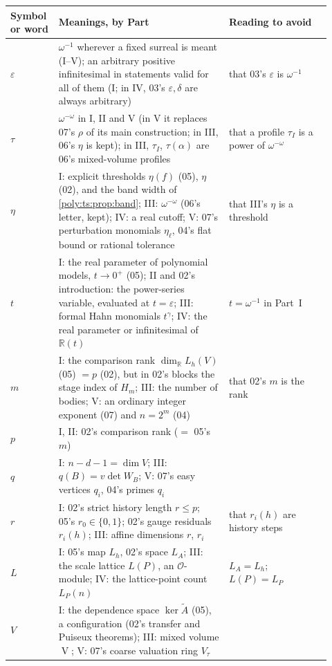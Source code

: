 \documentclass[11pt,a4paper]{article}
\numberwithin{equation}{section}
\theoremstyle{plain}
\newcommand{\R}{\mathbb R}
\newcommand{\eps}{\varepsilon}
\newcommand{\Atil}{\widetilde A}
\newcommand{\OO}{\mathcal O}
\newcommand{\MV}{\operatorname{V}}
\begin{document}
{\small
\begin{longtable}{@{}>{\raggedright\arraybackslash}p{0.12\linewidth}>{\raggedright\arraybackslash}p{0.5\linewidth}>{\raggedright\arraybackslash}p{0.3\linewidth}@{}}
\toprule
Symbol or word & Meanings, by Part & Reading to avoid\\
\midrule
\endhead
\bottomrule
\endfoot
$\eps$ & $\omega^{-1}$ wherever a fixed surreal is meant (I--V); an arbitrary positive infinitesimal in statements valid for all of them (I; in IV, 03's $\eps,\delta$ are always arbitrary) & that 03's $\eps$ is $\omega^{-1}$\\
$\tau$ & $\omega^{-\omega}$ in I, II and V (in V it replaces 07's $\rho$ of its main construction; in III, 06's $\eta$ is kept); in III, $\tau_I$, $\tau(\alpha)$ are 06's mixed-volume profiles & that a profile $\tau_I$ is a power of $\omega^{-\omega}$\\
$\eta$ & I: explicit thresholds $\eta(f)$ (05), $\eta$ (02), and the band width of \cref{poly:ts:prop:band}; III: $\omega^{-\omega}$ (06's letter, kept); IV: a real cutoff; V: 07's perturbation monomials $\eta_\ell$, 04's flat bound or rational tolerance & that III's $\eta$ is a threshold\\
$t$ & I: the real parameter of polynomial models, $t\to0^+$ (05); II and 02's introduction: the power-series variable, evaluated at $t=\eps$; III: formal Hahn monomials $t^\gamma$; IV: the real parameter or infinitesimal of $\R(t)$ & $t=\omega^{-1}$ in Part~I\\
$m$ & I: the comparison rank $\dim_\R L_h(V)$ (05) $=p$ (02), but in 02's blocks the stage index of $H_m$; III: the number of bodies; V: an ordinary integer exponent (07) and $n=2^m$ (04) & that 02's $m$ is the rank\\
$p$ & I, II: 02's comparison rank ($=$ 05's $m$) & \\
$q$ & I: $n-d-1=\dim V$; III: $q(B)=v\det W_B$; V: 07's easy vertices $q_i$, 04's primes $q_i$ & \\
$r$ & I: 02's strict history length $r\le p$; 05's $r_0\in\{0,1\}$; 02's gauge residuals $r_i(h)$; III: affine dimensions $r$, $r_i$ & that $r_i(h)$ are history steps\\
$L$ & I: 05's map $L_h$, 02's space $L_A$; III: the scale lattice $L(P)$, an $\OO$-module; IV: the lattice-point count $L_P(n)$ & $L_A=L_h$; $L(P)=L_P$\\
$V$ & I: the dependence space $\ker\Atil$ (05), a configuration (02's transfer and Puiseux theorems); III: mixed volume $\MV$; V: 07's coarse valuation ring $V_\tau$ & \\

\end{longtable}}
\end{document}
